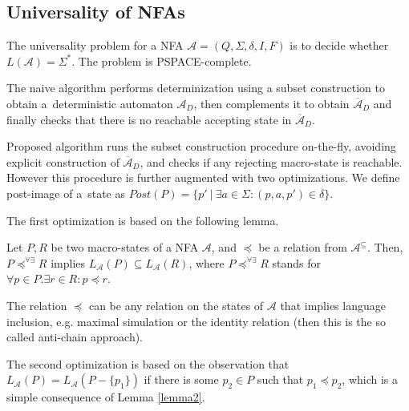 \subsection{Universality of NFAs}\label{NFAuniv}

The universality problem for a NFA $\mathcal{A} = (Q, \Sigma, \delta, I, F)$ is
to decide whether $L(\mathcal{A}) = \Sigma^*$. The problem is PSPACE-complete.

The naive algorithm performs determinization using a subset construction to
obtain a~deterministic automaton $\mathcal{A}_D$, then complements it to obtain
$\overline{\mathcal{A}}_D$ and finally checks that there is no reachable
accepting state in $\overline{\mathcal{A}}_D$.

Proposed algorithm \cite{tacas} runs the subset construction procedure
on-the-fly, avoiding explicit construction of $\overline{\mathcal{A}}_D$, and
checks if any rejecting macro-state is reachable. However this procedure is
further augmented with two optimizations. We define post-image of a~state as
$Post(P) = \{p'\ |\ \exists a \in \Sigma: (p, a, p') \in \delta\}$.

The first optimization is based on the following lemma.

\begin{lemma}\label{lemma2}
 Let $P, R$ be two macro-states of a NFA $\mathcal{A}$, and $\preceq$ be a
 relation from $\mathcal{A}^\subseteq$. Then, $P \preceq^{\forall\exists} R$
 implies $L_\mathcal{A}(P) \subseteq L_\mathcal{A}(R)$, where $P
 \preceq^{\forall\exists} R$ stands for $\forall p \in P. \exists r\in R : p
 \preceq r$.
\end{lemma}

The relation $\preceq$ can be any relation on the states of $\mathcal{A}$ that
implies language inclusion, e.g. maximal simulation or the identity relation
(then this is the so called anti-chain approach).

The second optimization is based on the observation that $L_\mathcal{A}(P) =
L_\mathcal{A}(P - \{p_1\})$ if there is some $p_2 \in P$ such that $p_1 \preceq 
p_2$, which is a simple consequence of Lemma \ref{lemma2}.

